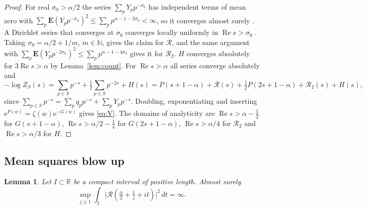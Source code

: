 \documentclass[11pt]{amsart}
\newtheorem{lemma}{Lemma}[section]
\theoremstyle{remark}
\numberwithin{equation}{section}
\newcommand{\R}{\mathbb{R}}
\newcommand{\N}{\mathbb{N}}
\newcommand{\Ex}{\mathbf{E}}
\newcommand{\cR}{\mathcal{R}}
\newcommand{\e}{\mathrm{e}}
\DeclareMathOperator{\re}{Re}
\begin{document}
\begin{proof}
For real $\sigma_0>\alpha/2$ the series $\sum_pY_pp^{-\sigma_0}$ has independent terms of mean zero with $\sum_p\Ex(Y_pp^{-\sigma_0})^2\le\sum_pp^{\alpha-1-2\sigma_0}<\infty$, so it converges almost surely \cite[\S2.5]{Durrett}. A Dirichlet series that converges at $\sigma_0$ converges locally uniformly in $\re s>\sigma_0$ \cite[Theorem~1.1]{MVbook}. Taking $\sigma_0=\alpha/2+1/m$, $m\in\N$, gives the claim for $\cR$, and the same argument with $\sum_p\Ex(Y_pp^{-2\sigma_0})^2\le\sum_pp^{\alpha-1-4\sigma_0}$ gives it for $\cR_2$. $H$ converges absolutely for $3\re s>\alpha$ by Lemma~\ref{lem:count}. For $\re s>\alpha$ all series converge absolutely and
\[
-\log Z_S(s)=\sum_{p\in S}p^{-s}+\tfrac12\sum_{p\in S}p^{-2s}+H(s)=P(s+1-\alpha)+\cR(s)+\tfrac12P(2s+1-\alpha)+\cR_2(s)+H(s),
\]
since $\sum_{p\in S}p^{-s}=\sum_pq_pp^{-s}+\sum_pY_pp^{-s}$. Doubling, exponentiating and inserting $\e^{P(w)}=\zeta(w)\e^{-G(w)}$ gives \eqref{eq:V}. The domains of analyticity are $\re s>\alpha-\tfrac12$ for $G(s+1-\alpha)$, $\re s>\alpha/2-\tfrac14$ for $G(2s+1-\alpha)$, $\re s>\alpha/4$ for $\cR_2$ and $\re s>\alpha/3$ for $H$.
\end{proof}

\subsection{Mean squares blow up}

\begin{lemma}\label{lem:blowup}
Let $I\subset\R$ be a compact interval of positive length. Almost surely
\[
\sup_{j\ge1}\int_I\bigl|\cR(\tfrac{\alpha}{2}+\tfrac1j+it)\bigr|^2\,dt=\infty .
\]
\end{lemma}
\end{document}
